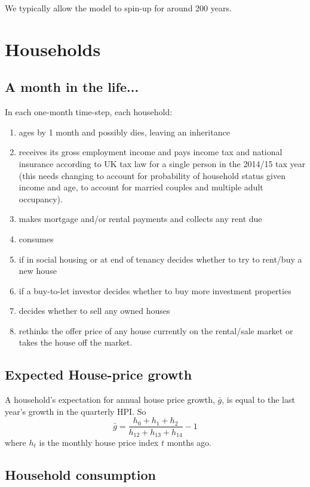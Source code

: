 \documentclass{report}
\begin{document}
We typically allow the model to spin-up for around 200 years.

\section{Households}

\subsection{A month in the life...}
In each one-month time-step, each household:
\begin{enumerate}
\item ages by 1 month and possibly dies, leaving an inheritance
\item receives its gross employment income and pays income tax and national insurance according to UK tax law for a single person in the 2014/15 tax year (this needs changing to account for probability of household status given income and age, to account for married couples and multiple adult occupancy).
\item makes mortgage and/or rental payments and collects any rent due
\item consumes
\item if in social housing or at end of tenancy decides whether to try to rent/buy a new house
\item if a buy-to-let investor decides whether to buy more investment properties
\item decides whether to sell any owned houses
\item rethinks the offer price of any house currently on the rental/sale market or takes the house off the market.
\end{enumerate}


\subsection{Expected House-price growth}
A household's expectation for annual house price growth, $\bar{g}$, is equal to the last year's growth in the quarterly HPI. So
\begin{equation}
\bar{g} = \frac{h_0 + h_{1} + h_{2}}{h_{12} + h_{13} + h_{14}} - 1
\end{equation}
where $h_t$ is the monthly house price index $t$ months ago.

\subsection{Household consumption}
\end{document}

